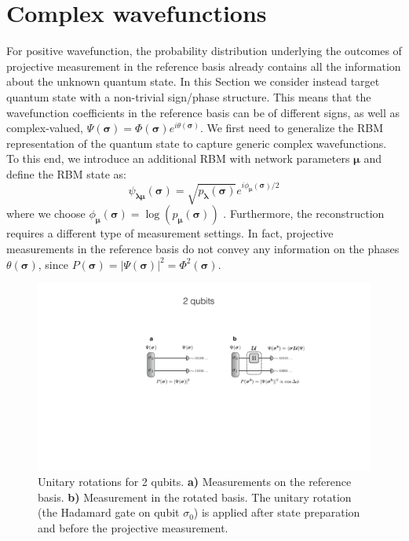\documentclass[submission, Phys, hidelinks]{SciPost}
\begin{document}
\section{Complex wavefunctions}
\label{sec:complex}
For positive wavefunction, the probability distribution underlying the outcomes of projective measurement in the reference basis already contains all the information about the unknown quantum state. In this Section we consider instead target quantum state with a non-trivial sign/phase structure. This means that the wavefunction coefficients in the reference basis can be of different signs, as well as complex-valued, $\Psi(\bm{\sigma})=\Phi(\bm{\sigma})e^{i\theta(\bm{\sigma})}$. We first need to generalize the RBM representation of the quantum state to capture generic complex wavefunctions. To this end, we introduce an additional RBM with network parameters $\bm{\mu}$ and define the RBM state as:
\begin{equation}
\psi_{\bm{\lambda} \bm{\mu}} (\bm{\sigma})= \sqrt{p_{\bm{\lambda}} (\bm{\sigma})} e^{i \phi_{\bm{\mu}} (\bm{\sigma})/2}
\end{equation}
where we choose $\phi_{\bm{\mu}}(\bm{\sigma}) = \log (p_{\bm{\mu}} (\bm{\sigma}))$ \cite{torlai2018tomography}. Furthermore, the reconstruction requires a different type of measurement settings. In fact, projective measurements in the reference basis do not convey any information on the phases $\theta(\bm{\sigma})$, since $P(\bm{\sigma})=|\Psi(\bm{\sigma})|^2=\Phi^2(\bm{\sigma})$.




\begin{figure}[bht]
\noindent \centering{}\includegraphics[width=\columnwidth]{plots/2qubits_rotation}
\caption[The quantum many-body problem]{Unitary rotations for 2 qubits. {\bf a)} Measurements on the reference basis. {\bf b)} Measurement in the rotated basis. The unitary rotation (the Hadamard gate on qubit $\sigma_0$) is applied after state preparation and before the projective measurement.}
\label{phase_learn} 
\end{figure}
\end{document}
